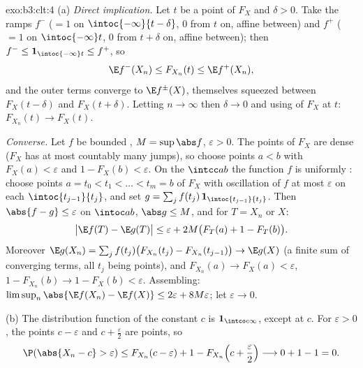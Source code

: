 \begin{solution}{exo:b3:clt:4}
(a) \emph{Direct implication.} Let $t$ be a  point
of $F_X$ and $\delta > 0$. Take the  ramps
$f^-$ ($= 1$ on $\intoc{-\infty}{t-\delta}$, $0$ from $t$
on, affine between) and $f^+$ ($= 1$ on $\intoc{-\infty}t$,
$0$ from $t + \delta$ on, affine between); then $f^- \leq
\mathbf 1_{\intoc{-\infty}t} \leq f^+$, so
\[
\E f^-(X_n) \leq F_{X_n}(t) \leq \E f^+(X_n),
\]
and the outer terms converge to $\E f^\pm(X)$, themselves
squeezed between $F_X(t - \delta)$ and $F_X(t + \delta)$.
Letting $n \to \infty$ then $\delta \to 0$ and using
 of $F_X$ at $t$: $F_{X_n}(t) \to F_X(t)$.

\emph{Converse.} Let $f$ be bounded , $M =
\sup\abs f$, $\varepsilon > 0$. The  points of
$F_X$ are dense ($F_X$ has at most countably many jumps), so
choose  points $a < b$ with $F_X(a) < \varepsilon$
and $1 - F_X(b) < \varepsilon$. On the  $\intcc ab$
the function $f$ is uniformly : choose 
points $a = t_0 < t_1 < \dots < t_m = b$ of $F_X$ with
oscillation of $f$ at most $\varepsilon$ on each
$\intoc{t_{j-1}}{t_j}$, and set $g = \sum_j
f(t_j)\,\mathbf 1_{\intoc{t_{j-1}}{t_j}}$. Then $\abs{f - g}
\leq \varepsilon$ on $\intoc ab$, $\abs g \leq M$, and for
$T = X_n$ or $X$:
\[
\bigl|\E f(T) - \E g(T)\bigr| \leq \varepsilon +
2M\bigl(F_T(a) + 1 - F_T(b)\bigr).
\]
Moreover $\E g(X_n) = \sum_j f(t_j)\bigl(F_{X_n}(t_j) -
F_{X_n}(t_{j-1})\bigr) \to \E g(X)$ (a finite sum of
converging terms, all $t_j$ being  points), and
$F_{X_n}(a) \to F_X(a) < \varepsilon$, $1 - F_{X_n}(b) \to 1
- F_X(b) < \varepsilon$. Assembling:
$\limsup_n\abs{\E f(X_n) - \E f(X)} \leq 2\varepsilon +
8M\varepsilon$; let $\varepsilon \to 0$.

(b) The distribution function of the constant $c$ is
$\mathbf 1_{\intco c\infty}$,  except at $c$. For
$\varepsilon > 0$, the points $c - \varepsilon$ and $c +
\frac\varepsilon2$ are  points, so
\[
\P(\abs{X_n - c} > \varepsilon) \leq F_{X_n}(c -
\varepsilon) + 1 - F_{X_n}\Bigl(c + \frac\varepsilon2\Bigr)
\longrightarrow 0 + 1 - 1 = 0 .
\]
\end{solution}

